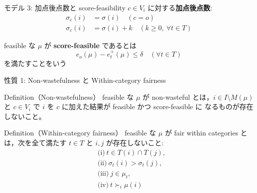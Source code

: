 \documentclass[aspectratio=43,11pt]{beamer}
\newcommand{\muc}[1]{\mu_{#1}}
\newcommand{\eo}{e_o}
\newcommand{\et}{e_t^{+}}
\newcommand{\score}{\sigma}
\begin{document}
\begin{frame}{モデル 3: 加点後点数と score-feasibility}
  $c \in V_i$ に対する\textbf{加点後点数}:
  \begin{align*}
    \score_c(i) &= \score(i) \quad (c = o)\\
    \score_c(i) &= \score(i) + k \quad (k \ge 0,\ \forall t \in T)
  \end{align*}

  \vspace{0.5em}
  feasible な $\mu$ が \textbf{score-feasible} であるとは
  \[
    \eo(\mu) - \et(\mu) \le \delta \quad (\forall t \in T)
  \]
  を満たすことをいう
\end{frame}

\begin{frame}{性質 1: Non-wastefulness と Within-category fairness}
  \begin{block}{Definition（Non-wastefulness）}
    feasible な $\mu$ が non-wasteful とは，$i \in I \setminus M(\mu)$ と
    $c \in V_i$ で $i$ を $c$ に加えた結果が feasible かつ score-feasible に
    なるものが存在しないこと。
  \end{block}

  \begin{block}{Definition（Within-category fairness）}
    feasible な $\mu$ が fair within categories とは，次を全て満たす
    $t \in T$ と $i, j$ が存在しないこと:
    \begin{align*}
      &\text{(i)}\ t \in T(i) \cap T(j),\\
      &\text{(ii)}\ \score_t(i) > \score_t(j),\\
      &\text{(iii)}\ j \in \muc{t},\\
      &\text{(iv)}\ t \succ_i \mu(i)
    \end{align*}
  \end{block}
\end{frame}
\end{document}
